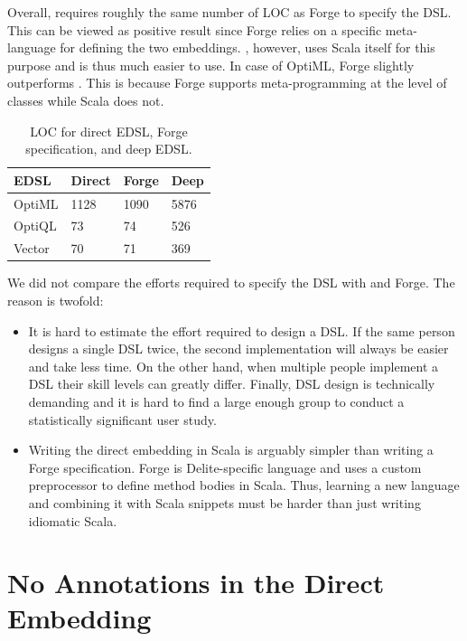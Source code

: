 Overall, \yy requires roughly the same number of LOC as Forge to specify the DSL.
This can be viewed as positive result since Forge relies on a specific meta-language
 for defining the two embeddings. \yy, however, uses Scala itself
for this purpose and is thus much easier to use. In case of OptiML, Forge
slightly outperforms \yy. This is because Forge supports meta-programming at
the level of classes while Scala does not.

\begin{table}[ht]
\caption{LOC for direct EDSL, Forge specification, and deep EDSL.}
\label{tbl:deepgen}
\centering
\begin{tabularx}{\linewidth}{ X X X X }
\toprule
 EDSL       &   Direct      &     Forge     &   Deep      \\ \midrule
OptiML      &   1128        &     1090    &   5876      \\
OptiQL      &   73          &     74      &   526       \\
Vector      &   70          &     71      &   369       \\
\bottomrule
\end{tabularx}
\end{table}

We did not compare the efforts required to specify the DSL with \yy and Forge. The
reason is twofold:
\begin{itemize}

\item It is hard to estimate the effort required to design a DSL. If the same
person designs a single DSL twice, the second implementation will always be
easier and take less time. On the other hand, when multiple people implement a DSL their skill levels
can greatly differ. Finally, DSL design is technically demanding and it is hard to find
a large enough group to conduct a statistically significant user
study.

\item Writing the direct embedding in Scala is arguably simpler than writing a
Forge specification. Forge is Delite-specific language and uses a custom
preprocessor to define method bodies in Scala. Thus, learning a new language and
combining it with Scala snippets must be harder than just writing idiomatic
Scala.
\end{itemize}

\section{No Annotations in the Direct Embedding}
\label{subsec:correctness}

